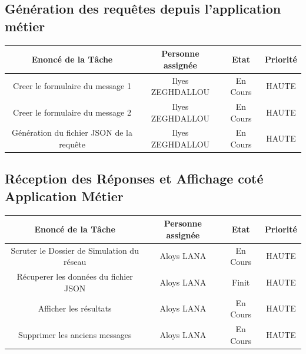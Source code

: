 \documentclass[a4paper, 11pt]{article}
\begin{document}
    \subsection{Génération des requêtes depuis l'application métier}
    \begin{center}
    \begin{tabular}{|c|c|c|c|}
        \hline
        Enoncé de la Tâche & Personne assignée & Etat & Priorité\\
        \hline
        \hline
        Creer le formulaire du message 1  & Ilyes ZEGHDALLOU & En Cours & HAUTE \\
        \hline
        Creer le formulaire du message 2  & Ilyes ZEGHDALLOU & En Cours & HAUTE \\
        \hline
        Génération du fichier JSON de la requête  & Ilyes ZEGHDALLOU & En Cours & HAUTE \\
        \hline
    \end{tabular}
    \end{center}

    \subsection{Réception des Réponses et Affichage coté Application Métier}
    \begin{center}
    \begin{tabular}{|c|c|c|c|}
        \hline
        Enoncé de la Tâche & Personne assignée & Etat & Priorité\\
        \hline
        \hline
        Scruter le Dossier de Simulation du réseau  & Aloys LANA & En Cours & HAUTE \\
        \hline
        Récuperer les données du fichier JSON  & Aloys LANA & Finit & HAUTE \\
        \hline
        Afficher les résultats  & Aloys LANA & En Cours & HAUTE \\
        \hline
        Supprimer les anciens messages  & Aloys LANA & En Cours & HAUTE \\
        \hline
    \end{tabular}
    \end{center}
\end{document}

